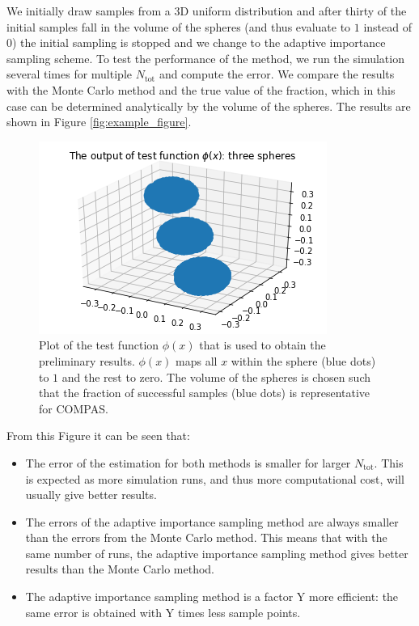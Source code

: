 \documentclass[a4paper,fleqn,usenatbib]{mnras}
\begin{document}
We initially draw samples from a 3D uniform distribution and after thirty of the initial samples fall in the volume of the spheres (and thus evaluate to $1$ instead of $0$) the initial sampling is stopped and we change to the adaptive importance sampling scheme. 
To test the performance of the method, we run the simulation several times for multiple $N_{\text{tot}}$ and compute the error. We compare the results with the Monte Carlo method and the true value of the fraction, which in this case can be determined analytically by the volume of the spheres. The results are shown in Figure \ref{fig:example_figure}.
%
%
\begin{figure}
	\includegraphics[width=\columnwidth]{spheres}
    \caption{	Plot of the test function $\phi(x)$ that is used to obtain the preliminary results. $\phi(x)$ maps all $x$ within the sphere (blue dots) to $1$ and the rest to zero. The volume of the spheres is chosen such that the fraction of successful samples (blue dots) is representative for COMPAS.}
    \label{fig:spheres}
\end{figure}
%
%
%  
From this Figure  it can be seen that: 
\begin{itemize}
\item The error of the estimation for both methods is smaller for larger $N_{\text{tot}}$. This is expected as more simulation runs, and thus more computational cost, will usually give better results. 
\item The errors of the adaptive importance sampling method are always smaller than the errors from the Monte Carlo method. This means that with the same number of runs, the adaptive importance sampling method gives better results than the Monte Carlo method. 
\item The adaptive importance sampling method is a factor Y more efficient: the same error is obtained with Y times less sample points. 
\end{itemize} 
\end{document}

